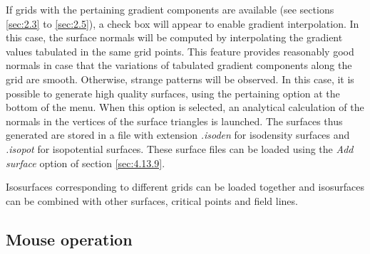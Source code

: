 \documentclass[10pt]{article}
\begin{document}
If grids with the pertaining gradient components are available (see sections \ref{sec:2.3}
to \ref{sec:2.5}), a check box will appear to enable gradient interpolation. In this case,
the surface normals will be computed by interpolating the gradient values tabulated in the same
grid points. This feature provides reasonably good normals in case that the variations
of tabulated gradient components along the grid are smooth. Otherwise, strange patterns will
be observed. In this case, it is possible to generate high quality 
surfaces, 
using the pertaining option at the bottom of the menu. When this option is selected,
an analytical calculation of the normals 
in the vertices of the surface triangles is launched.
The surfaces thus generated are stored in a file with extension 
{\it .isoden} for isodensity surfaces
and {\it .isopot} for isopotential surfaces. 
These surface files can be loaded using the {\it Add surface} option
of section \ref{sec:4.13.9}.

Isosurfaces corresponding to different grids 
can be loaded together and isosurfaces can be combined with other surfaces, critical points
and field lines.

\subsection{Mouse operation \label{sec:4.14}}
\end{document}
